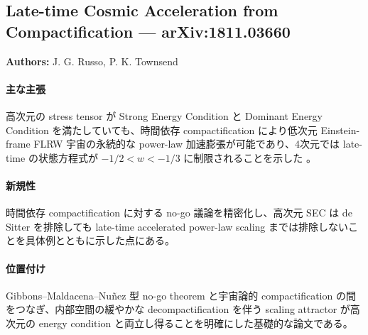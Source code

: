 \subsection{Late-time Cosmic Acceleration from Compactification --- arXiv:1811.03660}

\textbf{Authors:} J. G. Russo, P. K. Townsend

\paragraph{主な主張}
高次元の stress tensor が Strong Energy Condition と Dominant Energy Condition を満たしていても、時間依存 compactification により低次元 Einstein-frame FLRW 宇宙の永続的な power-law 加速膨張が可能であり、4次元では late-time の状態方程式が $-1/2<w<-1/3$ に制限されることを示した \cite{Russo:2018compactification}。

\paragraph{新規性}
時間依存 compactification に対する no-go 議論を精密化し、高次元 SEC は de Sitter を排除しても late-time accelerated power-law scaling までは排除しないことを具体例とともに示した点にある。

\paragraph{位置付け}
Gibbons--Maldacena--Nu\~nez 型 no-go theorem と宇宙論的 compactification の間をつなぎ、内部空間の緩やかな decompactification を伴う scaling attractor が高次元の energy condition と両立し得ることを明確にした基礎的な論文である。
